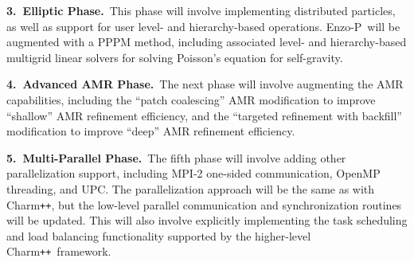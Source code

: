 \documentclass[11pt,letterpaper]{article}
\newcommand{\enzoii}{\textsf{Enzo-P}}
\newcommand{\pp}{\texttt{++}}
\newcommand{\charm}{\textsf{Charm\pp}}
\begin{document}
\textbf{3.~Elliptic Phase.}~This phase will involve implementing
distributed particles, as well as support for user level- and
hierarchy-based operations.  \enzoii\ will be augmented with a PPPM
method, including associated level- and hierarchy-based multigrid
linear solvers for solving Poisson's equation for self-gravity.

\textbf{4.~Advanced AMR Phase.}~The next phase will involve augmenting the
AMR capabilities, including the ``patch coalescing'' AMR modification
to improve ``shallow'' AMR refinement efficiency, and the ``targeted
refinement with backfill'' modification to improve ``deep'' AMR
refinement efficiency.

\textbf{5.~Multi-Parallel Phase.}~The fifth phase will involve adding
other parallelization support, including MPI-2 one-sided
communication, OpenMP threading, and UPC.  The parallelization
approach will be the same as with \charm, but the low-level parallel
communication and synchronization routines will be updated.  This will
also involve explicitly implementing the task scheduling and load
balancing functionality supported by the higher-level \charm\
framework.



%
\end{document}
